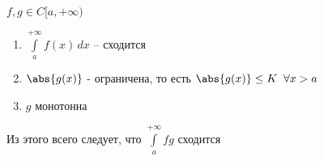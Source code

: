 
\begin{theorem}\slashns
	
	$f,g \in C[a,+\infty)$
	
	\begin{enumerate}
		\item $\int\limits_a^{+\infty} f(x) \, dx$ -- сходится
        \item $\abs{g(x)}$ - ограничена, то есть $\abs{g(x)} \le K \;\; \forall x > a$ 
		\item $g$ монотонна
	\end{enumerate}
	
	Из этого всего следует, что $\int\limits_a^{+\infty} fg$ сходится
\end{theorem}

